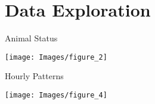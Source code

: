 \section{Data Exploration}

\begin{frame}[c]{Animal Status}
	\vspace{-0.5cm}
	\begin{center}
		\texttt{[image: Images/figure\_2]}
	\end{center}
\end{frame}

\begin{frame}[c]{Hourly Patterns}
	\vspace{-0.5cm}
	\begin{center}
		\texttt{[image: Images/figure\_4]}
	\end{center}
\end{frame}
